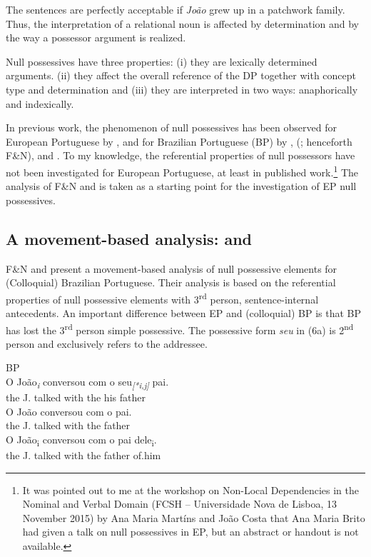 \documentclass[output=paper]{langsci/langscibook}
\begin{document}
The sentences are perfectly acceptable if \textit{João} grew up in a patchwork family. Thus, the interpretation of a relational noun is affected by determination and by the way a possessor argument is realized.

Null possessives have three properties: (i) they are lexically determined arguments. (ii) they affect the overall reference of the DP together with concept type and determination and (iii) they are interpreted in two ways: anaphorically and indexically.

In previous work, the phenomenon of null possessives has been observed for European Portuguese by \citet[350, Footnote 30]{Mateus2003}, and for Brazilian Portuguese (BP) by \citet{Floripi2003}, \citeauthor{Floripi2009} (\citeyear{Floripi2009}; henceforth F\&N), and \citet{Rodrigues2010}. To my knowledge, the referential properties of null possessors have not been investigated for European Portuguese, at least in published work.\footnote{It was pointed out to me at the workshop on Non-Local Dependencies in the Nominal and Verbal Domain (FCSH – Universidade Nova de Lisboa, 13 November 2015) by Ana Maria Martíns and João Costa that Ana Maria Brito had given a talk on null possessives in EP, but an abstract or handout is not available.} The analysis of F\&N and \citet{Rodrigues2010} is taken as a starting point for the investigation of EP null possessives.

\subsection{A movement-based analysis: \citet{Floripi2009} and \citet{Rodrigues2010}}%

F\&N and \citet{Rodrigues2010} present a movement-based analysis of null possessive elements for (Colloquial) Brazilian Portuguese. Their analysis is based on the referential properties of null possessive elements with 3\textsuperscript{rd} person, sentence-internal antecedents. An important difference between EP and (colloquial) BP is that BP has lost the 3\textsuperscript{rd} person simple possessive. The possessive form \textit{seu} in (6a) is 2\textsuperscript{nd} person and exclusively refers to the addressee.

\ea%
    BP\label{ex:wein:6}\\
    \ea
    \gll O João\textit{\textsubscript{i}} conversou com o   seu\textit{\textsubscript{[*i,j]}} pai.\\
         the J.   talked   with the his   father\\
    \ex  
    \gll O João conversou com o pai.\\
         the J. talked with the father\\
    \ex  
    \gll O João\textsubscript{i} conversou com o pai dele\textsubscript{i}.\\
         the J.   talked with the father of.him\\
    \z
\z
\end{document}
